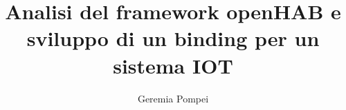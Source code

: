 \documentclass{unicam_thesis}
\title{Analisi del framework openHAB e sviluppo di un binding per un sistema IOT}
\author{Geremia Pompei}%
\theoremstyle{definition} \newtheorem{esempio}{Esempio}[chapter]
\theoremstyle{definition}
\begin{document}
\maketitle

\tableofcontents
\lstlistoflistings
\listoffigures
\listoftables







\appendix
%
%
%

\printbibliography

\printindex


\end{document}
